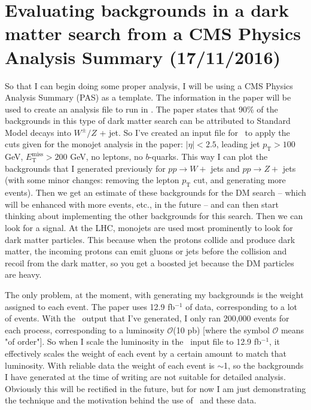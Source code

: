 \newpage
\section{Evaluating backgrounds in a dark matter search from a CMS Physics Analysis Summary (17/11/2016)}

So that I can begin doing some proper analysis, I will be using a CMS Physics Analysis Summary (PAS) \cite{CMS:2016pod} as a template. The information in the paper will be used to create an analysis file to run in \madanalysis. The paper states that 90\% of the backgrounds in this type of dark matter search can be attributed to Standard Model decays into $W^{\pm} / Z$ + jet. So I've created an input file for \madanalysis\ to apply the cuts given for the monojet analysis in the paper: $|\eta| < 2.5$, leading jet $p_{\mathrm{T}} > 100$ GeV, $E_{\mathrm{T}}^{\mathrm{miss}} > 200$ GeV, no leptons, no $b$-quarks. This way I can plot the backgrounds that I generated previously for $pp \rightarrow W +$ jets and $pp \rightarrow Z +$ jets (with some minor changes: removing the lepton $p_{\mathrm{T}}$ cut, and generating more events). Then we get an estimate of these backgrounds for the DM search -- which will be enhanced with more events, etc., in the future -- and can then start thinking about implementing the other backgrounds for this search. Then we can look for a signal. At the LHC, monojets are used most prominently to look for dark matter particles. This because when the protons collide and produce dark matter, the incoming protons can emit gluons or jets before the collision and recoil from the dark matter, so you get a boosted jet because the DM particles are heavy.

The only problem, at the moment, with generating my backgrounds is the weight assigned to each event. The paper uses 12.9 fb$^{-1}$ of data, corresponding to a lot of events. With the \madgraph\ output that I've generated, I only ran 200,000 events for each process, corresponding to a luminosity $\mathcal{O}$(10 pb) [where the symbol $\mathcal{O}$ means "of order"]. So when I scale the luminosity in the \madanalysis\ input file to 12.9 fb$^{-1}$, it effectively scales the weight of each event by a certain amount to match that luminosity. With reliable data the weight of each event is $\sim$1, so the backgrounds I have generated at the time of writing are not suitable for detailed analysis. Obviously this will be rectified in the future, but for now I am just demonstrating the technique and the motivation behind the use of \madanalysis\ and these data.

